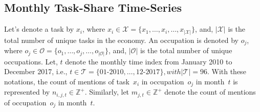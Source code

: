 \documentclass[letterpaper]{article} %
\begin{document}
\subsection{Monthly Task-Share Time-Series}
\label{subsec:monthly_taskshare}
%
Let's denote a task by $x_i$, where $x_i \in \mathcal{X} = \{ x_1, \hdots, x_i, \hdots, x_{|\mathcal{X}|}\}$, and, $|\mathcal{X}|$ is the total number of unique tasks in the economy. An occupation is denoted by $o_j$, where $o_j \in \mathcal{O} = \{ o_1, \hdots, o_j, \hdots, o_{|\mathcal{O}|}\}$, and, $|\mathcal{O}|$ is the total number of unique occupations. Let, $t$ denote the monthly time index from January 2010 to December 2017, i.e., $t \in \mathcal{T} = \{ 01\text{-}2010, \hdots, 12\text{-}2017 \}, with |\mathcal{T}|=96 $. With these notations, the count of mentions of task~$x_i$ in occupation~$o_j$ in month~$t$ is represented by $n_{i,j,t} \in \mathbb{Z}^{+}$. Similarly, let $m_{j,t} \in \mathbb{Z}^{+}$ denote the count of mentions of occupation~$o_j$ in month~$t$. 
\end{document}
